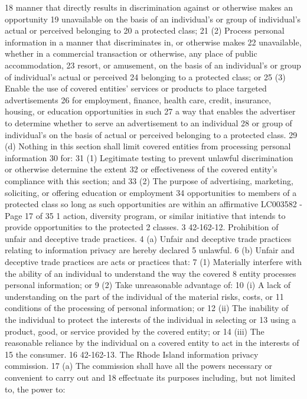 18 manner that directly results in discrimination against or otherwise makes an opportunity
19 unavailable on the basis of an individual's or group of individual's actual or perceived belonging to
20 a protected class;
21 (2) Process personal information in a manner that discriminates in, or otherwise makes
22 unavailable, whether in a commercial transaction or otherwise, any place of public accommodation,
23 resort, or amusement, on the basis of an individual's or group of individual's actual or perceived
24 belonging to a protected class; or
25 (3) Enable the use of covered entities' services or products to place targeted advertisements
26 for employment, finance, health care, credit, insurance, housing, or education opportunities in such
27 a way that enables the advertiser to determine whether to serve an advertisement to an individual
28 or group of individual's on the basis of actual or perceived belonging to a protected class.
29 (d) Nothing in this section shall limit covered entities from processing personal information
30 for:
31 (1) Legitimate testing to prevent unlawful discrimination or otherwise determine the extent
32 or effectiveness of the covered entity's compliance with this section; and
33 (2) The purpose of advertising, marketing, soliciting, or offering education or employment
34 opportunities to members of a protected class so long as such opportunities are within an affirmative 
LC003582 - Page 17 of 35
1 action, diversity program, or similar initiative that intends to provide opportunities to the protected
2 classes.
3 42-162-12. Prohibition of unfair and deceptive trade practices.
4 (a) Unfair and deceptive trade practices relating to information privacy are hereby declared
5 unlawful.
6 (b) Unfair and deceptive trade practices are acts or practices that:
7 (1) Materially interfere with the ability of an individual to understand the way the covered
8 entity processes personal information; or
9 (2) Take unreasonable advantage of:
10 (i) A lack of understanding on the part of the individual of the material risks, costs, or
11 conditions of the processing of personal information; or
12 (ii) The inability of the individual to protect the interests of the individual in selecting or
13 using a product, good, or service provided by the covered entity; or
14 (iii) The reasonable reliance by the individual on a covered entity to act in the interests of
15 the consumer.
16 42-162-13. The Rhode Island information privacy commission.
17 (a) The commission shall have all the powers necessary or convenient to carry out and
18 effectuate its purposes including, but not limited to, the power to:
